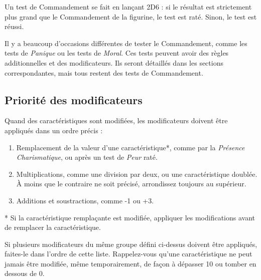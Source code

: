 Un test de Commandement se fait en lançant 2D6 : si le résultat est strictement plus grand que le Commandement de la figurine, le test est raté. Sinon, le test est réussi. 

Il y a beaucoup d'occasions différentes de tester le Commandement, comme les tests de \emph{Panique} ou les tests de \emph{Moral}. Ces tests peuvent avoir des règles additionnelles et des modificateurs. Ils seront détaillés dans les sections correspondantes, mais tous restent des tests de Commandement.

\subsection{Priorité des modificateurs}
\label{modificateurs}

Quand des caractéristiques sont modifiées, les modificateurs doivent être appliqués dans un ordre précis :
\begin{enumerate}
\item Remplacement de la valeur d'une caractéristique*, comme par la \emph{Présence Charismatique}, ou après un test de \emph{Peur} raté.
\item Multiplications, comme une division par deux, ou une caractéristique doublée. À moins que le contraire ne soit précisé, arrondissez toujours au supérieur.
\item Additions et soustractions, comme -1 ou +3.
\end{enumerate}

* Si la caractéristique remplaçante est modifiée, appliquer les modifications avant de remplacer la caractéristique. 

Si plusieurs modificateurs du même groupe défini ci-dessus doivent être appliqués, faites-le dans l'ordre de cette liste. Rappelez-vous qu'une caractéristique ne peut jamais être modifiée, même temporairement, de façon à dépasser 10 ou tomber en dessous de 0.

